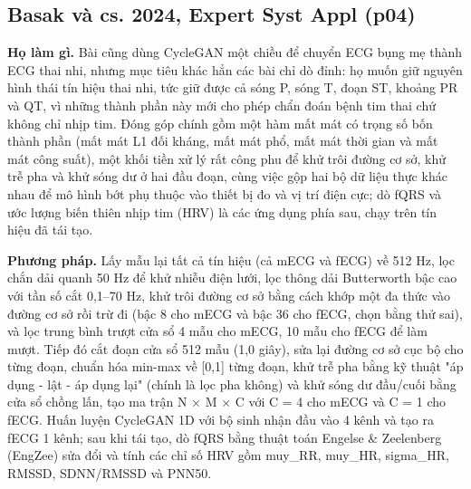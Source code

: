 \documentclass[12pt,a4paper]{article}
\begin{document}
\subsection{Basak và cs. 2024, Expert Syst Appl \normalfont\small (p04)}
\par\vspace{2pt}
\par\vspace{4pt}
\noindent \textbf{Họ làm gì.} Bài cũng dùng CycleGAN một chiều để chuyển ECG bụng mẹ thành ECG thai nhi, nhưng mục tiêu khác hẳn các bài chỉ dò đỉnh: họ muốn giữ nguyên hình thái tín hiệu thai nhi, tức giữ được cả sóng P, sóng T, đoạn ST, khoảng PR và QT, vì những thành phần này mới cho phép chẩn đoán bệnh tim thai chứ không chỉ nhịp tim. Đóng góp chính gồm một hàm mất mát có trọng số bốn thành phần (mất mát L1 đối kháng, mất mát phổ, mất mát thời gian và mất mát công suất), một khối tiền xử lý rất công phu để khử trôi đường cơ sở, khử trễ pha và khử sóng dư ở hai đầu đoạn, cùng việc gộp hai bộ dữ liệu thực khác nhau để mô hình bớt phụ thuộc vào thiết bị đo và vị trí điện cực; dò fQRS và ước lượng biến thiên nhịp tim (HRV) là các ứng dụng phía sau, chạy trên tín hiệu đã tái tạo.\par\vspace{3pt}
\noindent \textbf{Phương pháp.} Lấy mẫu lại tất cả tín hiệu (cả mECG và fECG) về 512 Hz, lọc chắn dải quanh 50 Hz để khử nhiễu điện lưới, lọc thông dải Butterworth bậc cao với tần số cắt 0,1–70 Hz, khử trôi đường cơ sở bằng cách khớp một đa thức vào đường cơ sở rồi trừ đi (bậc 8 cho mECG và bậc 36 cho fECG, chọn bằng thử sai), và lọc trung bình trượt cửa sổ 4 mẫu cho mECG, 10 mẫu cho fECG để làm mượt. Tiếp đó cắt đoạn cửa sổ 512 mẫu (1,0 giây), sửa lại đường cơ sở cục bộ cho từng đoạn, chuẩn hóa min-max về [0,1] từng đoạn, khử trễ pha bằng kỹ thuật "áp dụng - lật - áp dụng lại" (chính là lọc pha không) và khử sóng dư đầu/cuối bằng cửa sổ chồng lấn, tạo ma trận N × M × C với C = 4 cho mECG và C = 1 cho fECG. Huấn luyện CycleGAN 1D với bộ sinh nhận đầu vào 4 kênh và tạo ra fECG 1 kênh; sau khi tái tạo, dò fQRS bằng thuật toán Engelse \& Zeelenberg (EngZee) sửa đổi và tính các chỉ số HRV gồm muy\_RR, muy\_HR, sigma\_HR, RMSSD, SDNN/RMSSD và PNN50.\par\vspace{3pt}
\end{document}
